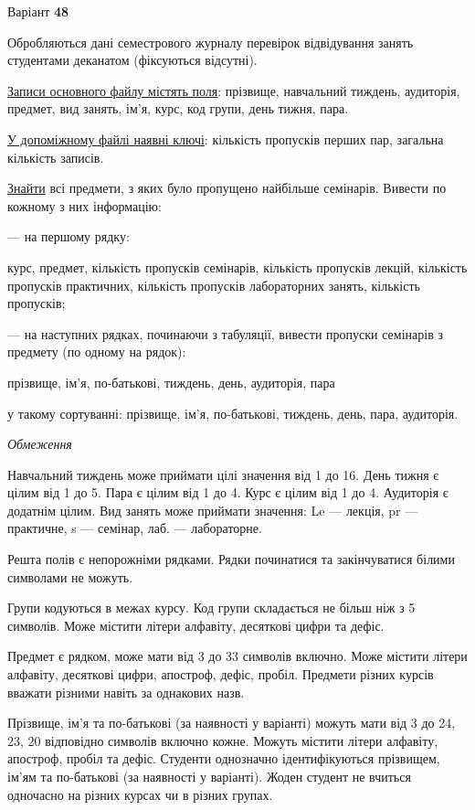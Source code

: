 \documentclass[11pt, ukrainian]{article}
\begin{document}
\par
\newpage
{\center Варіант  \No \textbf { 48 }\par}
\bigskip
Обробляються дані семестрового журналу перевірок відвідування занять студентами деканатом (фіксуються відсутні). 

\underline{Записи основного файлу містять поля}: прізвище, навчальний тиждень, аудиторія, предмет, вид занять, ім’я, курс, код групи, день тижня, пара.

\underline{У допоміжному файлі наявні ключі}: кількість пропусків перших пар, загальна кількість записів.

\underline{Знайти} всі предмети, з яких було пропущено найбільше семінарів. Вивести по кожному з них інформацію:\par
{\noindent}--- на першому рядку:\par
курс, предмет, кількість пропусків семінарів, кількість пропусків лекцій, кількість пропусків практичних, кількість пропусків лабораторних занять, кількість пропусків;

{\noindent}--- на наступних рядках, починаючи з табуляції, вивести пропуски семінарів з предмету (по одному на рядок):\par
прізвище, ім’я, по-батькові, тиждень, день, аудиторія, пара

{\noindent}у такому сортуванні: прізвище, ім’я, по-батькові, тиждень, день, пара, аудиторія.


\bigskip\textit{Обмеження}

Навчальний тиждень може приймати цілі значення від 1 до 16.
День тижня є цілим від 1 до 5. Пара є цілим від 1 до 4.
Курс є цілим від 1 до 4. Аудиторія є додатнім цілим.
Вид занять може приймати значення:
Le --- лекція, pr --- практичне, s --- семінар, лаб. --- лабораторне.

Решта полів є непорожніми рядками.
Рядки починатися та закінчуватися білими символами не можуть.

Групи кодуються в межах курсу.
Код групи складається не більш ніж з 5 символів.
Може містити літери алфавіту, десяткові цифри та дефіс.

Предмет є рядком, може мати від 3 до 33 символів включно.
Може містити літери алфавіту, десяткові цифри, апостроф, дефіс, пробіл.
Предмети різних курсів вважати різними навіть за однакових назв.

Прізвище, ім’я та по-батькові (за наявності у варіанті)
можуть мати від 3 до 24, 23, 20 відповідно символів включно кожне.
Можуть містити літери алфавіту, апостроф, пробіл та дефіс.
Студенти однозначно ідентифікуються прізвищем, ім’ям та по-батькові (за наявності у варіанті).
Жоден студент не вчиться одночасно на різних курсах чи в різних групах.
\end{document}

